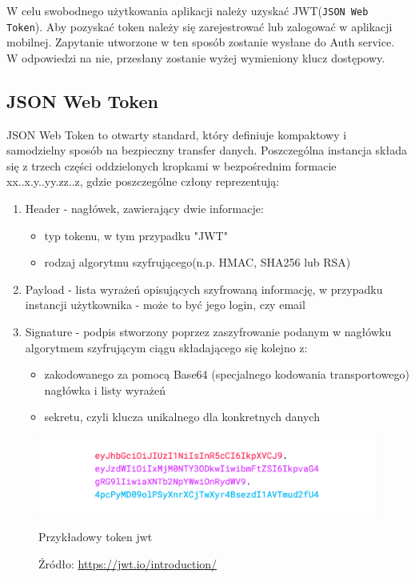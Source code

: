W celu swobodnego użytkowania aplikacji należy uzyskać JWT(\texttt{JSON Web Token}). Aby pozyskać token należy się zarejestrować lub zalogować w aplikacji mobilnej. Zapytanie utworzone w ten sposób zostanie wysłane do Auth service. W odpowiedzi na nie, przesłany zostanie wyżej wymieniony klucz dostępowy.

\subsection{JSON Web Token}

JSON Web Token to otwarty standard, który definiuje kompaktowy i samodzielny sposób na bezpieczny transfer danych. Poszczególna instancja składa się z trzech części oddzielonych kropkami w bezpośrednim formacie xx..x.y..yy.zz..z, gdzie poszczególne człony reprezentują:~\cite{jwt}
\begin{enumerate}%
	\item Header - nagłówek, zawierający dwie informacje:
		\begin{itemize}
			\item typ tokenu, w tym przypadku "JWT"
			\item rodzaj algorytmu szyfrującego(n.p. HMAC, SHA256 lub RSA)
		\end{itemize}

	\item Payload - lista wyrażeń opisujących szyfrowaną informację, w przypadku instancji użytkownika - może to być jego login, czy email
	
	\item Signature - podpis stworzony poprzez zaszyfrowanie podanym w nagłówku algorytmem szyfrującym ciągu składającego się kolejno z:
	\begin{itemize}
		\item zakodowanego za pomocą Base64 (specjalnego kodowania transportowego) nagłówka i listy wyrażeń
		\item sekretu, czyli klucza unikalnego dla konkretnych danych
	\end{itemize}
	\end{enumerate}

	\begin{figure}[H]
		\centering
		\includegraphics[width=\linewidth]{json-token.pdf}
		\caption{\centering Przykładowy token jwt}
		\caption*{\centering Źródło: \url{https://jwt.io/introduction/}}
	\end{figure}


